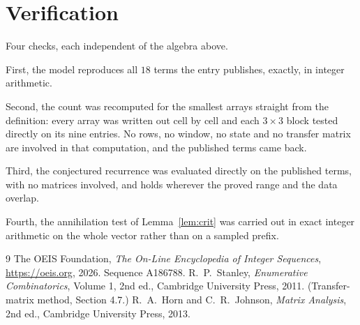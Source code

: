 \documentclass[11pt,a4paper]{article}
\theoremstyle{plain}
\theoremstyle{definition}
\begin{document}
\section{Verification}

Four checks, each independent of the algebra above.

First, the model reproduces all $18$ terms the entry publishes, exactly, in integer
arithmetic.

Second, the count was recomputed for the smallest arrays straight from the definition: every
array was written out cell by cell and each $3\times3$ block tested directly on its nine
entries. No rows, no window, no state and no transfer matrix are involved in that computation,
and the published terms came back.

Third, the conjectured recurrence was evaluated directly on the published terms, with no
matrices involved, and holds wherever the proved range and the data overlap.

Fourth, the annihilation test of Lemma~\ref{lem:crit} was carried out in exact integer
arithmetic on the whole vector rather than on a sampled prefix.

\begin{thebibliography}{9}
 The OEIS Foundation, \emph{The On-Line Encyclopedia of Integer
Sequences}, \url{https://oeis.org}, 2026. Sequence A186788.
 R.~P.~Stanley, \emph{Enumerative Combinatorics}, Volume 1, 2nd ed.,
Cambridge University Press, 2011. (Transfer-matrix method, Section 4.7.)
 R.~A.~Horn and C.~R.~Johnson, \emph{Matrix Analysis}, 2nd ed., Cambridge
University Press, 2013.
\end{thebibliography}
\end{document}
